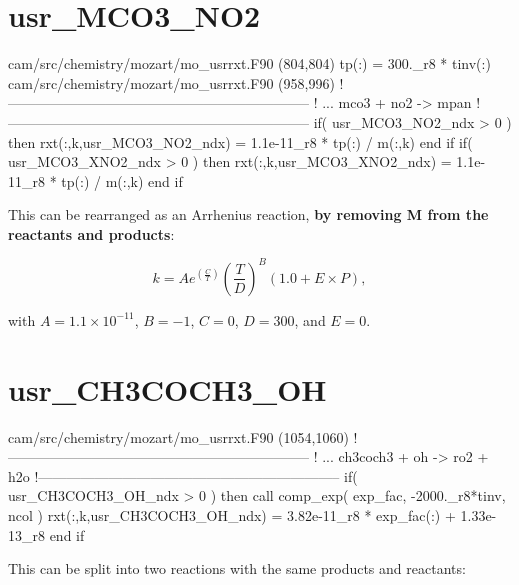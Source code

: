 \documentclass[titlepage]{article}
\begin{document}

\section{usr\_MCO3\_NO2}

\begin{blockcode}[commandchars=\\\{\}]
\color{gray}cam/src/chemistry/mozart/mo_usrrxt.F90 (804,804)
       tp(:)             = 300._r8 * tinv(:)
\color{gray}cam/src/chemistry/mozart/mo_usrrxt.F90 (958,996)
!-----------------------------------------------------------------
!     ... mco3 + no2 -> mpan
!-----------------------------------------------------------------
       if( usr_MCO3_NO2_ndx > 0 ) then
          rxt(:,k,usr_MCO3_NO2_ndx) = 1.1e-11_r8 * tp(:) / m(:,k)
       end if
       if( usr_MCO3_XNO2_ndx > 0 ) then
          rxt(:,k,usr_MCO3_XNO2_ndx) = 1.1e-11_r8 * tp(:) / m(:,k)
       end if
\end{blockcode}

This can be rearranged as an Arrhenius reaction, \textbf{by removing M from the reactants and products}:

\begin{equation}
k = Ae^{(\frac{C}{T})}(\frac{T}{D})^B(1.0+E \times P),
\end{equation}

\noindent with $A = 1.1 \times 10^{-11}$, $B = -1$, $C = 0$, $D = 300$, and $E = 0$.


\section{usr\_CH3COCH3\_OH}

\begin{blockcode}[commandchars=\\\{\}]
\color{gray}cam/src/chemistry/mozart/mo_usrrxt.F90 (1054,1060)
!-----------------------------------------------------------------
!       ... ch3coch3 + oh -> ro2 + h2o
!-----------------------------------------------------------------
       if( usr_CH3COCH3_OH_ndx > 0 ) then
          call comp_exp( exp_fac, -2000._r8*tinv, ncol )
          rxt(:,k,usr_CH3COCH3_OH_ndx) = 3.82e-11_r8 * exp_fac(:) + 1.33e-13_r8
       end if
\end{blockcode}

This can be split into two reactions with the same products and reactants:
\vspace{20px}
\end{document}

